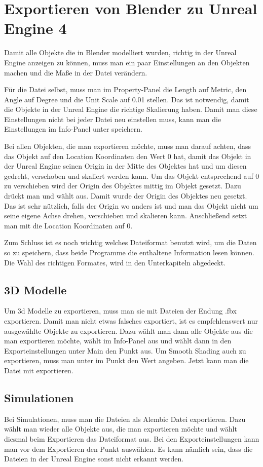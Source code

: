 \section{Exportieren von Blender zu Unreal Engine 4}
\label{Exportieren_von_Blender_zu_Unreal_Engine_4:ref1}
Damit alle Objekte die in Blender modelliert wurden, richtig in der Unreal Engine anzeigen zu können, muss man ein paar
Einstellungen an den Objekten machen und die Maße in der Datei verändern.

Für die Datei selbst, muss man im Property-Panel die Length auf Metric, den Angle auf Degree und die Unit Scale auf 0.01 stellen.
Das ist notwendig, damit die Objekte in der Unreal Engine die richtige Skalierung haben. Damit man diese Einstellungen nicht bei
jeder Datei neu einstellen muss, kann man die Einstellungen im Info-Panel unter  speichern.

Bei allen Objekten, die man exportieren möchte, muss man darauf achten, dass das Objekt auf den Location Koordinaten
den Wert 0 hat, damit das Objekt in der Unreal Engine seinen Origin in der Mitte des Objektes hat und um diesen gedreht, verschoben und skaliert werden kann.
Um das Objekt entsprechend auf 0 zu verschieben wird der Origin des Objektes mittig im Objekt gesetzt. Dazu drückt man  und
wählt  aus. Damit wurde der Origin des Objektes neu gesetzt. Das ist sehr nützlich, falls der Origin wo anders ist und man das
Objekt nicht um seine eigene Achse drehen, verschieben und skalieren kann. Anschließend setzt man mit  die Location Koordinaten auf 0.

Zum Schluss ist es noch wichtig welches Dateiformat benutzt wird, um die Daten so zu speichern, dass beide Programme die enthaltene
Information lesen können. Die Wahl des richtigen Formates, wird in den Unterkapiteln abgedeckt.

\subsection{3D Modelle}
Um 3d Modelle zu exportieren, muss man sie mit Dateien der Endung .fbx exportieren. Damit man nicht etwas falsches exportiert, ist es empfehlenswert
nur ausgewählte Objekte zu exportieren. Dazu wählt man dann alle Objekte aus die man exportieren möchte, wählt im Info-Panel  aus und wählt dann in den Exporteinstellungen unter Main den Punkt  aus. Um Smooth Shading auch zu exportieren,
muss man unter  im Punkt  den Wert  angeben. Jetzt kann man die Datei mit  exportieren.

\subsection{Simulationen}
Bei Simulationen, muss man die Dateien als Alembic Datei exportieren. Dazu wählt man wieder alle Objekte aus, die man exportieren möchte und
wählt diesmal beim Exportieren das Dateiformat  aus. Bei den Exporteinstellungen kann man vor dem Exportieren den Punkt  auswählen.
Es kann nämlich sein, dass die Dateien in der Unreal Engine sonst nicht erkannt werden.